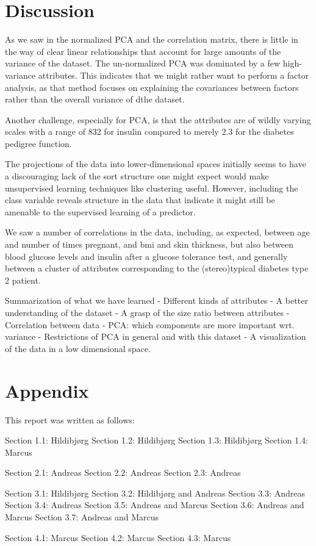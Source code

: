 \section{Discussion}
As we saw in the normalized PCA and the correlation matrix,
there is little in the way of clear
linear relationships that account for
large amounts of the variance of the dataset.
The un-normalized PCA was dominated by a few high-variance attributes.
This indicates that we might rather want to perform a factor analysis,
as that method focuses on explaining the covariances between factors rather
than the overall variance of dthe dataset.

Another challenge,
especially for PCA,
is that the attributes are of wildly varying scales
with a range of 832 for insulin compared to merely 2.3
for the diabetes pedigree function.

The projections of the data into lower-dimensional spaces
initially seems to have a discouraging lack of the sort structure
one might expect would make unsupervised learning techniques like clustering useful.
However, including the class variable reveals structure in the data
that indicate it might still be amenable to
the supervised learning of a predictor.

We saw a number of correlations in the data,
including, as expected,
between age and number of times pregnant,
and bmi and skin thickness,
but also between blood glucose levels and insulin after a glucose tolerance test,
and generally between a cluster of attributes corresponding to
the (stereo)typical diabetes type 2 patient.


Summarization of what we have learned
- Different kinds af attributes
- A better understanding of the dataset
- A grasp of the size ratio between attributes
- Correlation between data
- PCA: which components are more important wrt. variance
- Restrictions of PCA in general and with this dataset
- A visualization of the data in a low dimensional space.



\section{Appendix}
This report was written as follows:

Section 1.1: Hildibjørg
Section 1.2: Hildibjørg
Section 1.3: Hildibjørg
Section 1.4: Marcus

Section 2.1: Andreas
Section 2.2: Andreas
Section 2.3: Andreas

Section 3.1: Hildibjørg
Section 3.2: Hildibjørg and Andreas
Section 3.3: Andreas
Section 3.4: Andreas
Section 3.5: Andreas and Marcus
Section 3.6: Andreas and Marcus
Section 3.7: Andreas and Marcus

Section 4.1: Marcus
Section 4.2: Marcus
Section 4.3: Marcus
